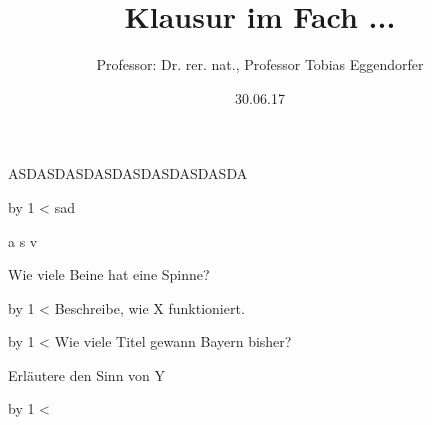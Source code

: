 \documentclass[addpoints]{exam}
\title{Klausur im Fach ...}
\author{Professor: Dr. rer. nat., Professor Tobias Eggendorfer}
\date{30.06.17}
\begin{document}
\maketitle
{}

\begin{center}
\gradetable[h][questions]
\end{center}

\newpage

\begin{questions}

\question[10]ASDASDASDASDASDASDASDASDA
            \newcount\grenze
                                \newcount\Scount
        \loop\vspace*{1cm}\par\goodbreak\advance\Scount by 1 \ifnum\Scount<\grenze\repeat
        \vspace{1cm}
\question[1]sad
     
        \begin{checkboxes}
                            \choice a
                    \choice s
                    \choice v
        
        \end{checkboxes}

        \vspace{1cm}
\question[10]Wie viele Beine hat eine Spinne?
            \newcount\grenze
                                \newcount\Scount
        \loop\vspace*{1cm}\par\goodbreak\advance\Scount by 1 \ifnum\Scount<\grenze\repeat
        \vspace{1cm}
\question[10]Beschreibe, wie X funktioniert.
            \newcount\grenze
                                \newcount\Scount
        \loop\vspace*{1cm}\par\goodbreak\advance\Scount by 1 \ifnum\Scount<\grenze\repeat
        \vspace{1cm}
\question[1]Wie viele Titel gewann Bayern bisher?
     
        \begin{checkboxes}
        
        \end{checkboxes}

        \vspace{1cm}
\question[10]Erläutere den Sinn von Y
            \newcount\grenze
                                \newcount\Scount
        \loop\vspace*{1cm}\par\goodbreak\advance\Scount by 1 \ifnum\Scount<\grenze\repeat
        \vspace{1cm}


\end{questions}
\end{document}
